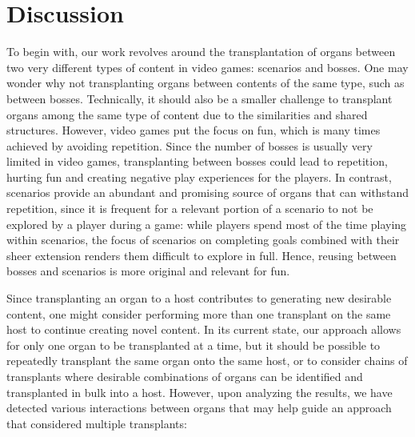 \section{Discussion}
\label{sec:Discussion}


To begin with, our work revolves around the transplantation of organs between two very different types of content in video games: scenarios and bosses. One may wonder why not transplanting organs between contents of the same type, such as between bosses. Technically, it should also be a smaller challenge to transplant organs among the same type of content due to the similarities and shared structures. However, video games put the focus on fun, which is many times achieved by avoiding repetition. Since the number of bosses is usually very limited in video games, transplanting between bosses could lead to repetition, hurting fun and creating negative play experiences for the players. In contrast, scenarios provide an abundant and promising source of organs that can withstand repetition, since it is frequent for a relevant portion of a scenario to not be explored by a player during a game: while players spend most of the time playing within scenarios, the focus of scenarios on completing goals combined with their sheer extension renders them difficult to explore in full. Hence, reusing between bosses and scenarios is more original and relevant for fun. 

Since transplanting an organ to a host contributes to generating new desirable content, one might consider performing more than one transplant on the same host to continue creating novel content. In its current state, our approach allows for only one organ to be transplanted at a time, but it should be possible to repeatedly transplant the same organ onto the same host, or to consider chains of transplants where desirable combinations of organs can be identified and transplanted in bulk into a host. However, upon analyzing the results, we have detected various interactions between organs that may help guide an approach that considered multiple transplants: 


